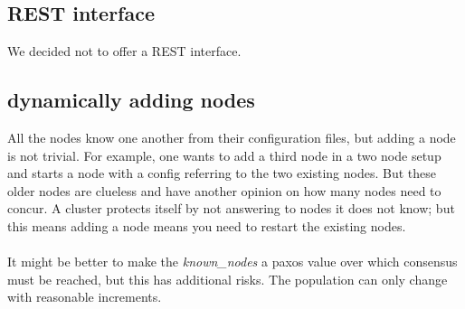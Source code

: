 \subsection{REST interface}
We decided not to offer a REST interface.
\subsection{dynamically adding nodes}
All the nodes know one another from their configuration files,
but adding a node is not trivial. 
For example, one wants to add a third node in a two node setup and starts a node with a config referring to the two existing nodes. 
But these older nodes are clueless 
and have another opinion on how many nodes need to concur. 
A cluster protects itself by not answering to nodes it does not know; 
but this means adding a node means you need to restart the existing nodes.

\paragraph{}
It might be better to make the \emph{known\_nodes} a paxos value 
over which consensus must be reached, but this has additional risks.
The population can only change with reasonable increments.

